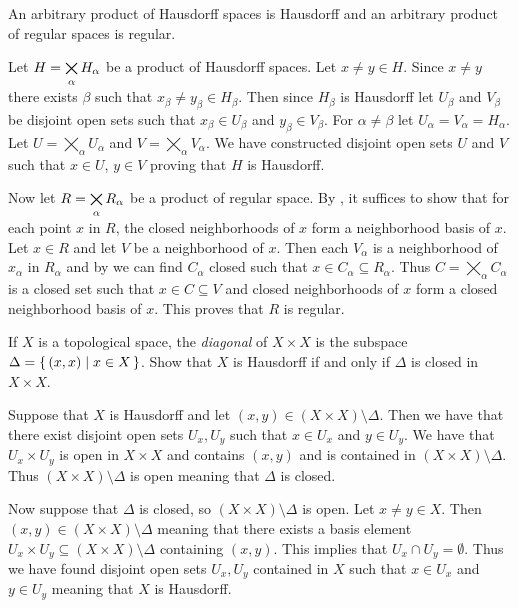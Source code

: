 \documentclass[letterpaper, 11pt, oneside]{book}
\begin{document}
\begin{exercise}
  An arbitrary product of Hausdorff spaces is Hausdorff and an arbitrary product of regular spaces is regular.
\end{exercise}
\begin{pf}
  Let $H = \bigtimes\limits_{\alpha} H_{\alpha}$ be a product of Hausdorff spaces.
  Let $x \neq y \in H$.
  Since $x \neq y$ there exists $\beta$ such that $x_{\beta} \neq y_{\beta} \in H_{\beta}$.
  Then since $H_{\beta}$ is Hausdorff let $U_{\beta}$ and $V_{\beta}$ be disjoint open sets such that $x_{\beta} \in U_{\beta}$ and $y_{\beta} \in V_{\beta}$.
  For $\alpha \neq \beta$ let $U_{\alpha} = V_{\alpha} = H_{\alpha}$.
  Let $U = \bigtimes_{\alpha} U_{\alpha}$ and $V = \bigtimes_{\alpha} V_{\alpha}$.
  We have constructed disjoint open sets $U$ and $V$ such that $x \in U$, $y \in V$ proving that $H$ is Hausdorff.

  Now let $R = \bigtimes\limits_{\alpha} R_{\alpha}$ be a product of regular space.
  By , it suffices to show that for each point $x$ in $R$, the closed neighborhoods of $x$ form a neighborhood basis of $x$.
  Let $x \in R$ and let $V$ be a neighborhood of $x$.
  Then each $V_{\alpha}$ is a neighborhood of $x_{\alpha}$ in $R_{\alpha}$ and by  we can find $C_{\alpha}$ closed such that $x \in C_{\alpha} \subseteq R_{\alpha}$.
  Thus $C = \bigtimes_{\alpha} C_{\alpha}$ is a closed set such that $x \in C \subseteq V$ and closed neighborhoods of $x$ form a closed neighborhood basis of $x$.
  This proves that $R$ is regular.
\end{pf}

\begin{exercise}
  If $X$ is a topological space, the \emph{diagonal} of $X \times X$ is the subspace $\Delta = \set{\pqty{x, x} | x \in X}$.
  Show that $X$ is Hausdorff if and only if $\Delta$ is closed in $X \times X$.
\end{exercise}
\begin{pf}
  Suppose that $X$ is Hausdorff and let $(x, y) \in (X \times X) \setminus \Delta$.
  Then we have that there exist disjoint open sets $U_{x}, U_{y}$ such that $x \in U_{x}$ and $y \in U_{y}$.
  We have that $U_{x} \times U_{y}$ is open in $X \times X$ and contains $(x, y)$ and is contained in $(X \times X) \setminus \Delta$.
  Thus $(X \times X) \setminus \Delta$ is open meaning that $\Delta$ is closed.

  Now suppose that $\Delta$ is closed, so $(X \times X) \setminus \Delta$ is open.
  Let $x \neq y \in X$.
  Then $(x, y) \in (X \times X) \setminus \Delta$ meaning that there exists a basis element $U_{x} \times U_{y} \subseteq (X \times X) \setminus \Delta$ containing $(x, y)$.
  This implies that $U_{x} \cap U_{y} = \emptyset$.
  Thus we have found disjoint open sets $U_{x}, U_{y}$ contained in $X$ such that $x \in U_{x}$ and $y \in U_{y}$ meaning that $X$ is Hausdorff.
\end{pf}
\end{document}
